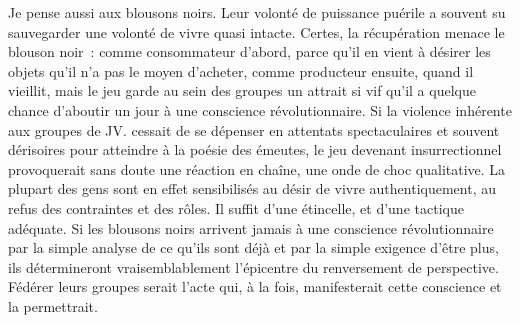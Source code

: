 \documentclass[french,twoside]{book} %
\begin{document}
Je pense aussi aux blousons noirs. Leur volonté de puissance puérile a souvent su sauvegarder une volonté de vivre quasi intacte. Certes, la récupération menace le blouson noir : comme consommateur d’abord, parce qu’il en vient à désirer les objets qu’il n’a pas le moyen d’acheter, comme producteur ensuite, quand il vieillit, mais le jeu garde au sein des groupes un attrait si vif qu’il a quelque chance d’aboutir un jour à une conscience révolutionnaire. Si la violence inhérente aux groupes de JV. cessait de se dépenser en attentats spectaculaires et souvent dérisoires pour atteindre à la poésie des émeutes, le jeu devenant insurrectionnel provoquerait sans doute une réaction en chaîne, une onde de choc qualitative. La plupart des gens sont en effet sensibilisés au désir de vivre authentiquement, au refus des contraintes et des rôles. Il suffit d’une étincelle, et d’une tactique adéquate. Si les blousons noirs arrivent jamais à une conscience révolutionnaire par la simple analyse de ce qu’ils sont déjà et par la simple exigence d’être plus, ils détermineront vraisemblablement l’épicentre du renversement de perspective. Fédérer leurs groupes serait l’acte qui, à la fois, manifesterait cette conscience et la permettrait.
\end{document}
